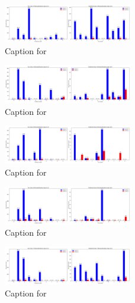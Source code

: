 \documentclass[12pt, a4paper]{article}
\begin{document}
\begin{figure}[ht]
\centering
\includegraphics[width=0.5\textwidth]{combined_class_boundary_pgd/combined_class_5_misclassifications_eps_0.5.png}
\caption{Caption for }
\label{fig:combined_class_5_misclassifications_eps_0.5.png}
\end{figure}

\begin{figure}[ht]
\centering
\includegraphics[width=0.5\textwidth]{combined_class_boundary_pgd/combined_class_4_misclassifications_eps_0.5.png}
\caption{Caption for }
\label{fig:combined_class_4_misclassifications_eps_0.5.png}
\end{figure}

\begin{figure}[ht]
\centering
\includegraphics[width=0.5\textwidth]{combined_class_boundary_pgd/combined_class_6_misclassifications_eps_0.5.png}
\caption{Caption for }
\label{fig:combined_class_6_misclassifications_eps_0.5.png}
\end{figure}



\begin{figure}[ht]
\centering
\includegraphics[width=0.5\textwidth]{combined_class_boundary_pgd/combined_class_8_misclassifications_eps_0.5.png}
\caption{Caption for }
\label{fig:combined_class_8_misclassifications_eps_0.5.png}
\end{figure}

\begin{figure}[ht]
\centering
\includegraphics[width=0.5\textwidth]{combined_class_boundary_pgd/combined_class_7_misclassifications_eps_0.5.png}
\caption{Caption for }
\label{fig:combined_class_7_misclassifications_eps_0.5.png}
\end{figure}
\end{document}
